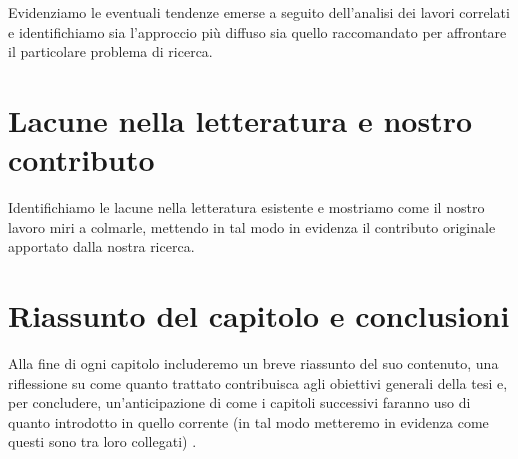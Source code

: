 Evidenziamo le eventuali tendenze emerse a seguito dell'analisi dei lavori correlati e identifichiamo sia l'approccio più diffuso sia quello raccomandato per affrontare il particolare problema di ricerca.

\section{Lacune nella letteratura e nostro contributo}

Identifichiamo le lacune nella letteratura esistente e mostriamo come il nostro lavoro miri a colmarle, mettendo in tal modo in evidenza il contributo originale apportato dalla nostra ricerca.

\section{Riassunto del capitolo e conclusioni}

Alla fine di ogni capitolo includeremo un breve riassunto del suo contenuto, una riflessione su come quanto trattato contribuisca agli obiettivi generali della tesi e, per concludere, un'anticipazione di come i capitoli successivi faranno uso di quanto introdotto in quello corrente (in tal modo metteremo in evidenza come questi sono tra loro collegati) \cite{zobel2015writing}.